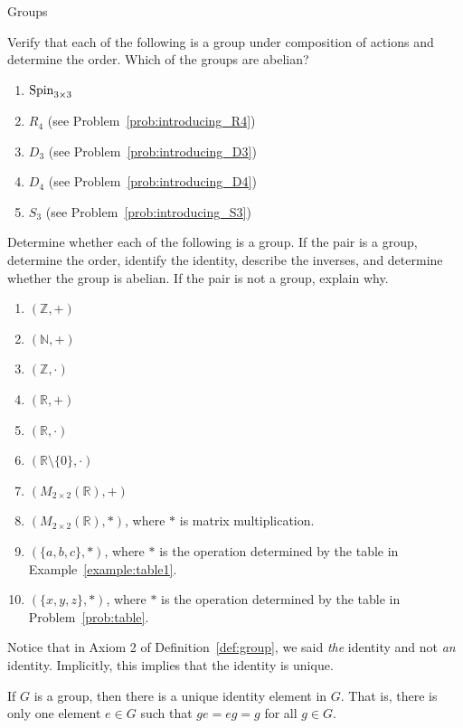 \begin{section}{Groups}
\begin{problem}
Verify that each of the following is a group under composition of actions and determine the order. Which of the groups are abelian?
\begin{enumerate}[label=\rm{(\alph*)}]
\item $\operatorname{Spin}_{3\times 3}$
\item $R_4$ (see Problem~\ref{prob:introducing_R4})
\item $D_3$ (see Problem~\ref{prob:introducing_D3})
\item $D_4$ (see Problem~\ref{prob:introducing_D4})
\item $S_3$ (see Problem~\ref{prob:introducing_S3})
\end{enumerate}
\end{problem}

\begin{problem}
Determine whether each of the following is a group.  If the pair is a group, determine the order, identify the identity, describe the inverses, and determine whether the group is abelian. If the pair is not a group, explain why.
\begin{enumerate}[label=\rm{(\alph*)}]
\item $(\mathbb{Z},+)$
\item $(\mathbb{N},+)$
\item $(\mathbb{Z},\cdot)$
\item $(\mathbb{R},+)$
\item $(\mathbb{R},\cdot)$
\item $(\mathbb{R}\setminus \{0\},\cdot)$
\item $(M_{2\times 2}(\mathbb{R}),+)$
\item $(M_{2\times 2}(\mathbb{R}),*)$, where $*$ is matrix multiplication.
\item $(\{a,b,c\},*)$, where $*$ is the operation determined by the table in Example~\ref{example:table1}.
\item $(\{x,y,z\},*)$, where $*$ is the operation determined by the table in Problem~\ref{prob:table}.
\end{enumerate}
\end{problem}

Notice that in Axiom 2 of Definition~\ref{def:group}, we said \emph{the} identity and not \emph{an} identity.  Implicitly, this implies that the identity is unique.

\begin{theorem}\label{thm:unique_id}
If $G$ is a group, then there is a unique identity element in $G$.  That is, there is only one element $e\in G$ such that $ge=eg=g$ for all $g\in G$.
\end{theorem}


\end{section}
